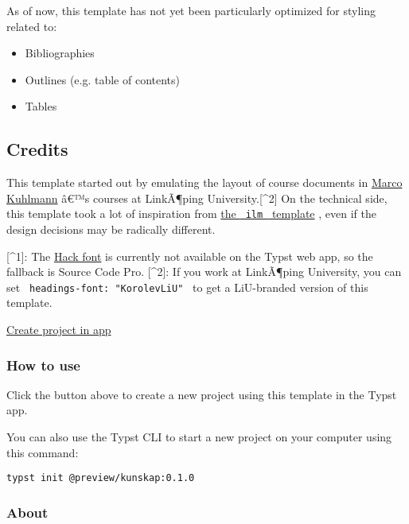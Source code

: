 As of now, this template has not yet been particularly optimized for
styling related to:

\begin{itemize}
\tightlist
\item
  Bibliographies
\item
  Outlines (e.g. table of contents)
\item
  Tables
\end{itemize}

\subsection{Credits}\label{credits}

This template started out by emulating the layout of course documents in
\href{https://liu.se/en/employee/marku61}{Marco Kuhlmann} â€™s courses
at LinkÃ¶ping University.{[}\^{}2{]} On the technical side, this
template took a lot of inspiration from
\href{https://github.com/talal/ilm/}{the \texttt{\ ilm\ } template} ,
even if the design decisions may be radically different.

{[}\^{}1{]}: The \href{https://github.com/source-foundry/Hack}{Hack
font} is currently not available on the Typst web app, so the fallback
is Source Code Pro. {[}\^{}2{]}: If you work at LinkÃ¶ping University,
you can set \texttt{\ headings-font:\ "KorolevLiU"\ } to get a
LiU-branded version of this template.

\href{/app?template=kunskap&version=0.1.0}{Create project in app}

\subsubsection{How to use}\label{how-to-use}

Click the button above to create a new project using this template in
the Typst app.

You can also use the Typst CLI to start a new project on your computer
using this command:

\begin{verbatim}
typst init @preview/kunskap:0.1.0
\end{verbatim}



\subsubsection{About}\label{about}

